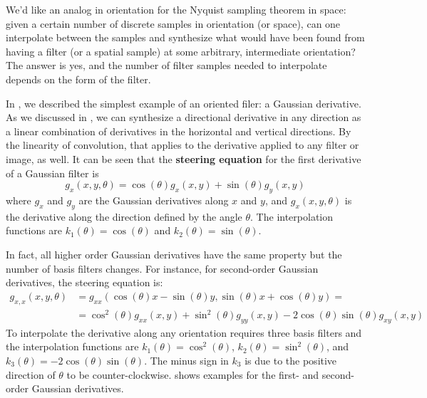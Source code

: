 We'd like an analog in orientation for the Nyquist sampling theorem in space:  given a certain number of discrete samples in orientation (or space), can one
interpolate between the samples and synthesize what would
have been found from having a filter (or a spatial sample) at some
arbitrary, intermediate orientation?    The answer is yes, and the
number of filter samples needed to interpolate depends on the form of
the filter.


In \chap{\ref{chapter:image_derivatives}}, we described the simplest example of an oriented filer: a Gaussian derivative. As we discussed in \eqn{\ref{eq:steerable_derivative_filter}}, we can synthesize a directional derivative in
any direction as a linear combination of derivatives in the horizontal
and vertical directions.  By the linearity of convolution, that applies to the derivative
applied to any filter or image, as well. It can be seen that the {\bf steering equation} 
for the first derivative
of a Gaussian filter is 
\begin{equation}
g_{x}(x,y,\theta) = \cos(\theta) g_x(x,y) + \sin(\theta) g_y(x,y)
\end{equation}
where $g_x$ and $g_y$ are the Gaussian derivatives along $x$ and $y$, and $g_{x}(x,y,\theta)$ is the derivative along the direction defined by the angle $\theta$. The interpolation functions are $k_1(\theta) = \cos(\theta)$ and $k_2(\theta) = \sin(\theta)$.

In fact, all higher order Gaussian derivatives have the same property but the number of basis filters changes. For instance, for second-order Gaussian derivatives, the steering equation is:
\begin{equation}
\begin{split}
g_{x,x}(x,y,\theta) & = g_{xx}(\cos(\theta) x - \sin (\theta) y, \sin(\theta) x + \cos (\theta)y) = \\
 &= \cos^2(\theta) g_{xx}(x,y) + \sin^2(\theta) g_{yy}(x,y) - 2 \cos(\theta) \sin(\theta) g_{xy}(x,y) 
\end{split}
\end{equation}
To interpolate the derivative along any orientation requires three basis filters and the interpolation functions are  $k_1(\theta) = \cos^2(\theta)$, $k_2(\theta) = \sin^2(\theta)$, and $k_3(\theta) = -2\cos(\theta)\sin(\theta)$. The minus sign in $k_3$ is due to the positive direction of $\theta$ to be counter-clockwise. \Fig{\ref{fig:steer1}} shows examples for the first- and second-order Gaussian derivatives. 

